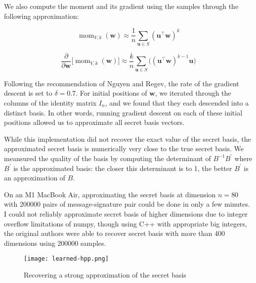 We also compute the moment and its gradient using the samples through the following approximation:

$$
\mathop{\text{mom}}_{V,k}(\mathbf{w}) \approx \frac{1}{n}\sum_{\mathbf{u} \in S} (\mathbf{u}^\intercal\mathbf{w})^k
$$

$$
\frac{\partial}{\partial\mathbf{w}}
\bigg\lbrack
    \mathop{\text{mom}}_{V,k}(\mathbf{w})
\bigg\rbrack
\approx \frac{k}{n}
\sum_{\mathbf{u} \in S} \bigg(
(\mathbf{u}^\intercal\mathbf{w})^{k-1}\mathbf{u}
\bigg)
$$

Following the recommendation of Nguyen and Regev, the rate of the gradient descent is set to $\delta = 0.7$. For initial positions of $\mathbf{w}$, we iterated through the columns of the identity matrix $I_n$, and we found that they each descended into a distinct basis. In other words, running gradient descent on each of these initial positions allowed us to approximate all secret basis vectors.

While this implementation did not recover the exact value of the secret basis, the approximated secret basis is numerically very close to the true secret basis. We meansured the quality of the basis by computing the determinant of $B^{-1}B^\prime$ where $B^\prime$ is the approximated basis: the closer this determinant is to 1, the better $B^\prime$ is an approximation of $B$.

On an M1 MacBook Air, approximating the secret basis at dimension $n = 80$ with 200000 pairs of message-signature pair could be done in only a few minutes. I could not reliably approximate secret basis of higher dimensions due to integer overflow limitations of numpy, though using C++ with appropriate big integers, the original authors were able to recover secret basis with more than 400 dimensions using 200000 samples.

\begin{figure}[h]
    \centering
    \texttt{[image: learned-hpp.png]}
    \caption{Recovering a strong approximation of the secret basis}
\end{figure}